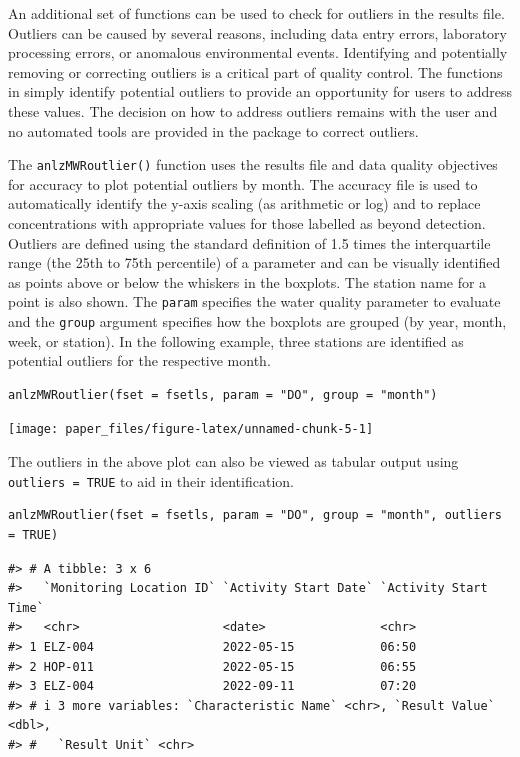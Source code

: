 An additional set of functions can be used to check for outliers in the results file. Outliers can be caused by several reasons, including data entry errors, laboratory processing errors, or anomalous environmental events. Identifying and potentially removing or correcting outliers is a critical part of quality control. The functions in  simply identify potential outliers to provide an opportunity for users to address these values. The decision on how to address outliers remains with the user and no automated tools are provided in the package to correct outliers.

The \texttt{anlzMWRoutlier()} function uses the results file and data quality objectives for accuracy to plot potential outliers by month. The accuracy file is used to automatically identify the y-axis scaling (as arithmetic or log) and to replace concentrations with appropriate values for those labelled as beyond detection. Outliers are defined using the standard definition of 1.5 times the interquartile range (the 25th to 75th percentile) of a parameter and can be visually identified as points above or below the whiskers in the boxplots. The station name for a point is also shown. The \texttt{param} specifies the water quality parameter to evaluate and the \texttt{group} argument specifies how the boxplots are grouped (by year, month, week, or station). In the following example, three stations are identified as potential outliers for the respective month.

\begin{verbatim}
anlzMWRoutlier(fset = fsetls, param = "DO", group = "month")
\end{verbatim}

\texttt{[image: paper\_files/figure-latex/unnamed-chunk-5-1]}

The outliers in the above plot can also be viewed as tabular output using \texttt{outliers\ =\ TRUE} to aid in their identification.

\begin{verbatim}
anlzMWRoutlier(fset = fsetls, param = "DO", group = "month", outliers = TRUE)
\end{verbatim}

\begin{verbatim}
#> # A tibble: 3 x 6
#>   `Monitoring Location ID` `Activity Start Date` `Activity Start Time`
#>   <chr>                    <date>                <chr>                
#> 1 ELZ-004                  2022-05-15            06:50                
#> 2 HOP-011                  2022-05-15            06:55                
#> 3 ELZ-004                  2022-09-11            07:20                
#> # i 3 more variables: `Characteristic Name` <chr>, `Result Value` <dbl>,
#> #   `Result Unit` <chr>
\end{verbatim}

